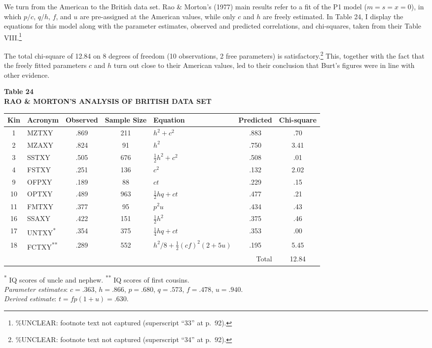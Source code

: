 ﻿\documentclass[12pt]{article}
\begin{document}
We turn from the American to the British data set. Rao \& Morton's (1977) main results refer to a fit of the P1 model ($m=s=x=0$), in which $p/c$, $q/h$, $f$, and $u$ are pre-assigned at the American values, while only $c$ and $h$ are freely estimated. In Table 24, I display the equations for this model along with the parameter estimates, observed and predicted correlations, and chi-squares, taken from their Table VIII.\footnote{\%UNCLEAR: footnote text not captured (superscript ``33'' at p.\ 92).}

The total chi-square of 12.84 on 8 degrees of freedom (10 observations, 2 free parameters) is satisfactory.\footnote{\%UNCLEAR: footnote text not captured (superscript ``34'' at p.\ 92).} This, together with the fact that the freely fitted parameters $c$ and $h$ turn out close to their American values, led to their conclusion that Burt's figures were in line with other evidence.

\begin{center}
\textbf{Table 24}\\
\textbf{RAO \& MORTON'S ANALYSIS OF BRITISH DATA SET}
\end{center}
\begin{center}
\small
\begin{tabular}{c l c c l c c}
\hline
Kin & Acronym & Observed & Sample Size & Equation & Predicted & Chi-square \\
\hline
1 & MZTXY & .869 & 211 & $h^2+c^2$ & .883 & .70 \\
2 & MZAXY & .824 & 91 & $h^2$ & .750 & 3.41 \\
3 & SSTXY & .505 & 676 & $\tfrac12h^2+c^2$ & .508 & .01 \\
4 & FSTXY & .251 & 136 & $c^2$ & .132 & 2.02 \\
9 & OFPXY & .189 & 88 & $ct$ & .229 & .15 \\
10 & OPTXY & .489 & 963 & $\tfrac12hq+ct$ & .477 & .21 \\
11 & FMTXY & .377 & 95 & $p^2u$ & .434 & .43 \\
16 & SSAXY & .422 & 151 & $\tfrac12h^2$ & .375 & .46 \\
17 & UNTXY\textsuperscript{*} & .354 & 375 & $\tfrac14hq+ct$ & .353 & .00 \\
18 & FCTXY\textsuperscript{**} & .289 & 552 & $h^2/8+\tfrac12(cf)^2(2+5u)$ & .195 & 5.45 \\
\hline
\multicolumn{6}{r}{Total} & 12.84 \\
\hline
\end{tabular}
\end{center}
\textsuperscript{*} IQ scores of uncle and nephew. \quad \textsuperscript{**} IQ scores of first cousins.\\
\emph{Parameter estimates}: $c=.363$, $h=.866$, $p=.680$, $q=.573$, $f=.478$, $u=.940$.\\
\emph{Derived estimate}: $t=fp(1+u)=.630$.
\end{document}
